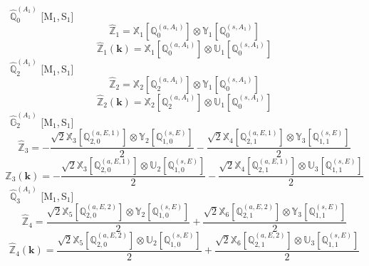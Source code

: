 \documentclass[fleqn,10pt,landscape]{article}
\begin{document}
\begin{itemize}
\vspace{4mm}
\noindent {} $\,\,\,\hat{\mathbb{Q}}_{0}^{(A_{1})}$ [M$_{1}$,\,S$_{1}$]
\begin{dmath*}
\hat{\mathbb{Z}}_{1}=\mathbb{X}_{1}[\mathbb{Q}_{0}^{(a,A_{1})}] \otimes\mathbb{Y}_{1}[\mathbb{Q}_{0}^{(s,A_{1})}]
\end{dmath*}
\begin{dmath*}
\hat{\mathbb{Z}}_{1}(\bm{k})=\mathbb{X}_{1}[\mathbb{Q}_{0}^{(a,A_{1})}] \otimes\mathbb{U}_{1}[\mathbb{Q}_{0}^{(s,A_{1})}]
\end{dmath*}
\vspace{4mm}
\noindent {} $\,\,\,\hat{\mathbb{Q}}_{2}^{(A_{1})}$ [M$_{1}$,\,S$_{1}$]
\begin{dmath*}
\hat{\mathbb{Z}}_{2}=\mathbb{X}_{2}[\mathbb{Q}_{2}^{(a,A_{1})}] \otimes\mathbb{Y}_{1}[\mathbb{Q}_{0}^{(s,A_{1})}]
\end{dmath*}
\begin{dmath*}
\hat{\mathbb{Z}}_{2}(\bm{k})=\mathbb{X}_{2}[\mathbb{Q}_{2}^{(a,A_{1})}] \otimes\mathbb{U}_{1}[\mathbb{Q}_{0}^{(s,A_{1})}]
\end{dmath*}
\vspace{4mm}
\noindent {} $\,\,\,\hat{\mathbb{G}}_{2}^{(A_{1})}$ [M$_{1}$,\,S$_{1}$]
\begin{dmath*}
\hat{\mathbb{Z}}_{3}=- \frac{\sqrt{2} \mathbb{X}_{3}[\mathbb{Q}_{2,0}^{(a,E,1)}] \otimes\mathbb{Y}_{2}[\mathbb{Q}_{1,0}^{(s,E)}]}{2} - \frac{\sqrt{2} \mathbb{X}_{4}[\mathbb{Q}_{2,1}^{(a,E,1)}] \otimes\mathbb{Y}_{3}[\mathbb{Q}_{1,1}^{(s,E)}]}{2}
\end{dmath*}
\begin{dmath*}
\hat{\mathbb{Z}}_{3}(\bm{k})=- \frac{\sqrt{2} \mathbb{X}_{3}[\mathbb{Q}_{2,0}^{(a,E,1)}] \otimes\mathbb{U}_{2}[\mathbb{Q}_{1,0}^{(s,E)}]}{2} - \frac{\sqrt{2} \mathbb{X}_{4}[\mathbb{Q}_{2,1}^{(a,E,1)}] \otimes\mathbb{U}_{3}[\mathbb{Q}_{1,1}^{(s,E)}]}{2}
\end{dmath*}
\vspace{4mm}
\noindent {} $\,\,\,\hat{\mathbb{Q}}_{3}^{(A_{1})}$ [M$_{1}$,\,S$_{1}$]
\begin{dmath*}
\hat{\mathbb{Z}}_{4}=\frac{\sqrt{2} \mathbb{X}_{5}[\mathbb{Q}_{2,0}^{(a,E,2)}] \otimes\mathbb{Y}_{2}[\mathbb{Q}_{1,0}^{(s,E)}]}{2} + \frac{\sqrt{2} \mathbb{X}_{6}[\mathbb{Q}_{2,1}^{(a,E,2)}] \otimes\mathbb{Y}_{3}[\mathbb{Q}_{1,1}^{(s,E)}]}{2}
\end{dmath*}
\begin{dmath*}
\hat{\mathbb{Z}}_{4}(\bm{k})=\frac{\sqrt{2} \mathbb{X}_{5}[\mathbb{Q}_{2,0}^{(a,E,2)}] \otimes\mathbb{U}_{2}[\mathbb{Q}_{1,0}^{(s,E)}]}{2} + \frac{\sqrt{2} \mathbb{X}_{6}[\mathbb{Q}_{2,1}^{(a,E,2)}] \otimes\mathbb{U}_{3}[\mathbb{Q}_{1,1}^{(s,E)}]}{2}

\end{dmath*}
\end{itemize}
\end{document}
